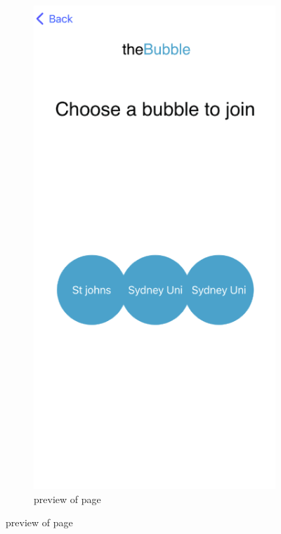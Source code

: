 \documentclass[a4paper, 11pt]{report}
\begin{document}
\begin{figure}
  \begin{subfigure}[h]{0.3\textwidth}
    \includegraphics[width=\textwidth]{preview.png}
    \caption{preview of page}
    \label{fig:image1}
  \end{subfigure}
  \hfill

\end{figure}
\end{document}
